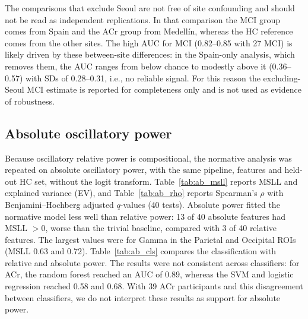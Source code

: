 \documentclass[11pt]{article}
\begin{document}
The comparisons that exclude Seoul are not free of site confounding and should not be read as independent replications. In that comparison the MCI group comes from Spain and the ACr group from Medell\'in, whereas the HC reference comes from the other sites. The high AUC for MCI (0.82--0.85 with 27 MCI) is likely driven by these between-site differences: in the Spain-only analysis, which removes them, the AUC ranges from below chance to modestly above it (0.36--0.57) with SDs of 0.28--0.31, i.e., no reliable signal. For this reason the excluding-Seoul MCI estimate is reported for completeness only and is not used as evidence of robustness.

\subsection{Absolute oscillatory power}
Because oscillatory relative power is compositional, the normative analysis was repeated on absolute oscillatory power, with the same pipeline, features and held-out HC set, without the logit transform. Table~\ref{tab:ab_msll} reports MSLL and explained variance (EV), and Table~\ref{tab:ab_rho} reports Spearman's $\rho$ with Benjamini--Hochberg adjusted $q$-values (40 tests). Absolute power fitted the normative model less well than relative power: 13 of 40 absolute features had MSLL $>0$, worse than the trivial baseline, compared with 3 of 40 relative features. The largest values were for Gamma in the Parietal and Occipital ROIs (MSLL 0.63 and 0.72). Table~\ref{tab:ab_cls} compares the classification with relative and absolute power. The results were not consistent across classifiers: for ACr, the random forest reached an AUC of 0.89, whereas the SVM and logistic regression reached 0.58 and 0.68. With 39 ACr participants and this disagreement between classifiers, we do not interpret these results as support for absolute power.
\end{document}
